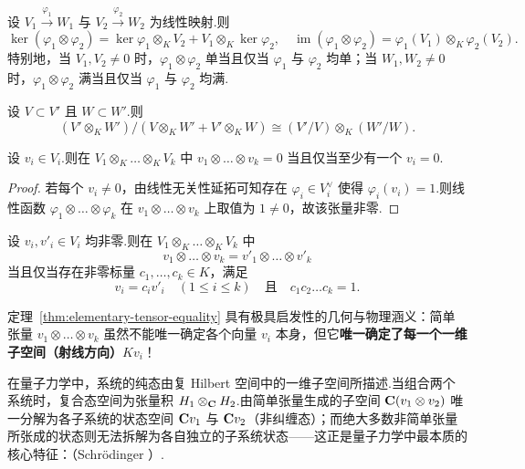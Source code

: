\begin{theorem}[线性映射张量积的核与像]\label{thm:image-kernel-vector-space}
设 $V_1 \xrightarrow{\varphi_1} W_1$ 与 $V_2 \xrightarrow{\varphi_2} W_2$ 为线性映射.则
\[
  \ker(\varphi_1 \otimes \varphi_2) = \ker \varphi_1 \otimes_K V_2 + V_1 \otimes_K \ker \varphi_2, \quad \operatorname{im}(\varphi_1 \otimes \varphi_2) = \varphi_1(V_1) \otimes_K \varphi_2(V_2).
\]
特别地，当 $V_1, V_2 \neq 0$ 时，$\varphi_1 \otimes \varphi_2$ 单当且仅当 $\varphi_1$ 与 $\varphi_2$ 均单；当 $W_1, W_2 \neq 0$ 时，$\varphi_1 \otimes \varphi_2$ 满当且仅当 $\varphi_1$ 与 $\varphi_2$ 均满.
\end{theorem}

\begin{corollary}\label{cor:subspace-quotient-tensor}
设 $V \subset V'$ 且 $W \subset W'$.则
\[
  (V' \otimes_K W') / (V \otimes_K W' + V' \otimes_K W) \cong (V'/V) \otimes_K (W'/W).
\]
\end{corollary}

\begin{theorem}\label{thm:elementary-tensor-zero}
设 $v_i \in V_i$.则在 $V_1 \otimes_K \dots \otimes_K V_k$ 中 $v_1 \otimes \dots \otimes v_k = 0$ 当且仅当至少有一个 $v_i = 0$.
\end{theorem}

\begin{proof}
若每个 $v_i \neq 0$，由线性无关性延拓可知存在 $\varphi_i \in V_i^\vee$ 使得 $\varphi_i(v_i) = 1$.则线性函数 $\varphi_1 \otimes \dots \otimes \varphi_k$ 在 $v_1 \otimes \dots \otimes v_k$ 上取值为 $1 \neq 0$，故该张量非零.
\end{proof}

\begin{theorem}[简单张量相等的充分必要条件]\label{thm:elementary-tensor-equality}
设 $v_i, v'_i \in V_i$ 均非零.则在 $V_1 \otimes_K \dots \otimes_K V_k$ 中
\[
  v_1 \otimes \dots \otimes v_k = v'_1 \otimes \dots \otimes v'_k
\]
当且仅当存在非零标量 $c_1, \dots, c_k \in K$，满足
\[
  v_i = c_i v'_i \quad (1 \leq i \leq k) \quad\text{且}\quad c_1 c_2 \dots c_k = 1.
\]
\end{theorem}

定理~\ref{thm:elementary-tensor-equality} 具有极具启发性的几何与物理涵义：简单张量 $v_1 \otimes \dots \otimes v_k$ 虽然不能唯一确定各个向量 $v_i$ 本身，但它\textbf{唯一确定了每一个一维子空间（射线方向）$K v_i$}！

在量子力学中，系统的纯态由复 Hilbert 空间中的一维子空间所描述.当组合两个系统时，复合态空间为张量积 $H_1 \otimes_{\mathbf{C}} H_2$.由简单张量生成的子空间 $\mathbf{C}(v_1 \otimes v_2)$ 唯一分解为各子系统的状态空间 $\mathbf{C} v_1$ 与 $\mathbf{C} v_2$（非纠缠态）；而绝大多数非简单张量所张成的状态则无法拆解为各自独立的子系统状态——这正是量子力学中最本质的核心特征：（Schr\"odinger \cite{schrodinger}）.


